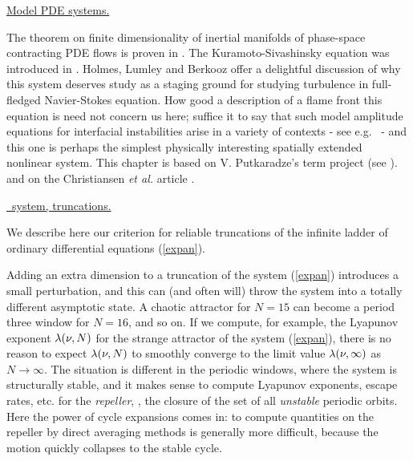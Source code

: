 

\underline{Model PDE systems.}{
The theorem on finite dimensionality of inertial manifolds
of phase-space contracting PDE flows is proven in .
The Kuramoto-Sivashinsky equation was introduced in .
Holmes, Lumley
and Berkooz offer a delightful discussion of why this system
deserves study as a staging ground for studying turbulence in 
full-fledged Navier-Stokes equation. 
How good 
a description of a flame front this equation
is need not concern us here; suffice it to say that such model
amplitude equations for interfacial instabilities arise in a variety
of contexts - see e.g.~ - and this one is perhaps the
simplest physically interesting spatially extended nonlinear system.
This chapter
is based on V. Putkaradze's term project
(see ).
and on the Christiansen {\em et al.} article . 

}

\underline{\KS\ system, truncations.}{
We describe here our criterion for reliable
truncations of the infinite ladder of 
ordinary differential equations (\ref{expan}).

Adding an extra dimension to a truncation of the system (\ref{expan})
introduces a small
perturbation, and this can (and often will) 
throw the system into a totally different asymptotic state. 
A  chaotic attractor for $N=15$ can become a period three 
window for $N=16$, and so on. 
If we compute, for example, the Lyapunov exponent
$\lambda(\nu,N)$ for the strange attractor of the 
system (\ref{expan}), there is no reason to 
expect $\lambda(\nu,N)$ to smoothly converge to the limit  
value $\lambda(\nu,\infty)$ as $N \rightarrow \infty$. 
The situation is different in the periodic windows, 
where the system is structurally stable, and it makes sense to compute 
 Lyapunov exponents, escape rates, etc. for the 
{\em repeller}, \ie, the closure of the set of all 
{\em unstable} periodic orbits. 
Here the power of cycle expansions comes in: 
to compute quantities on the repeller by direct averaging methods is 
generally more difficult, because the motion quickly collapses to the 
stable cycle. 
	} %


